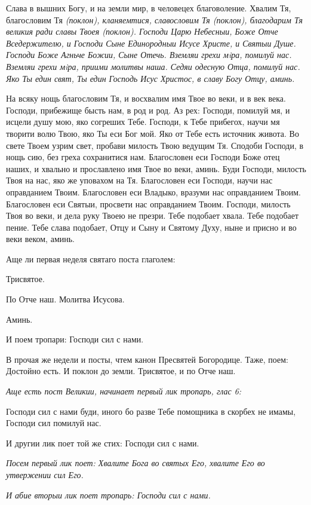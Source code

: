 Слава в вышних Богу, и на земли мир, в человецех благоволение. Хвалим Тя, благословим Тя \itshape (поклон)\normalfont{}, кланяемтися, славословим Тя \itshape (поклон)\normalfont{}, благодарим Тя великия ради славы Твоея \itshape (поклон)\normalfont{}. Господи Царю Небесныи, Боже Отче Вседержителю, и Господи Сыне Единородныи Исусе Христе, и Святыи Душе. Господи Боже Агньче Божии, Сыне Отечь. Вземляи грехи мiра, помилуй нас. Вземляи грехи мiра, приими молитвы наша. Седяи одесную Отца, помилуй нас. Яко Ты един свят, Ты един Господь Исус Христос, в славу Богу Отцу, аминь.


На всяку нощь благословим Тя, и восхвалим имя Твое во веки, и в век века. Господи, прибежище бысть нам, в род и род. Аз рех: Господи, помилуй мя, и исцели душу мою, яко согреших Тебе. Господи, к Тебе прибегох, научи мя творити волю Твою, яко Ты еси Бог мой. Яко от Тебе есть источник живота. Во свете Твоем узрим свет, пробави милость Твою ведущим Тя. Сподоби Господи, в нощь сию, без греха сохранитися нам. Благословен еси Господи Боже отец наших, и хвально и прославлено имя Твое во веки, аминь. Буди Господи, милость Твоя на нас, яко же уповахом на Тя. Благословен еси Господи, научи нас оправданием Твоим. Благословен еси Владыко, вразуми нас оправданием Твоим. Благословен еси Святыи, просвети нас оправданием Твоим. Господи, милость Твоя во веки, и дела руку Твоею не презри. Тебе подобает хвала. Тебе подобает пение. Тебе слава подобает, Отцу и Сыну и Святому Духу, ныне и присно и во веки веком, аминь.


Аще ли первая неделя святаго поста глаголем:


Трисвятое.


По Отче наш. Молитва Исусова.


Аминь.


И поем тропари: Господи сил с нами.


В прочая же недели и посты, чтем канон Пресвятей Богородице. Таже, поем: Достойно есть. И поклон до земли. Трисвятое, и по Отче наш.


\itshape Аще есть пост Великии, начинает первый лик тропарь, глас 6:\normalfont{}


Господи сил с нами буди, иного бо разве Тебе помощника в скорбех не имамы, Господи сил помилуй нас.


И другии лик поет той же стих: Господи сил с нами.


\itshape Посем первый лик поет:\normalfont{} Хвалите Бога во святых Его, хвалите Его во утвержении сил Его.


\itshape И абие вторыи лик поет тропарь:\normalfont{} Господи сил с нами.


